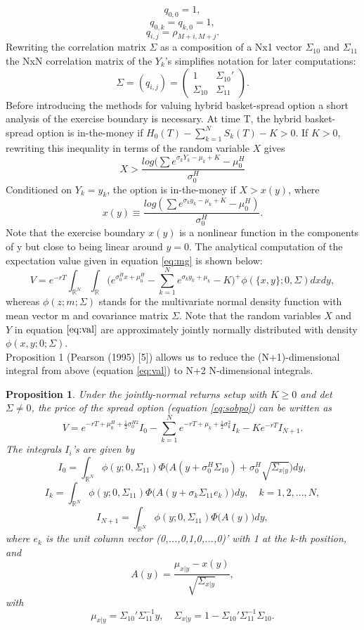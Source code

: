 \documentclass[a4paper]{article}
\newtheorem{prop}{Proposition}
\begin{document}
$$q_{0,0}=1,$$ 
$$q_{0,k}=q_{k,0}=1,$$
$$q_{i,j}=\rho_{M+i,M+j}.$$
Rewriting the correlation matrix $\Sigma$ as a composition of a Nx1 vector $\Sigma_{10}$ and $\Sigma_{11}$ the NxN correlation matrix of the $Y_k$'s simplifies notation for later computations:
$$\Sigma = (q_{i,j}) = \begin{pmatrix} 1 & \Sigma_{10}' \\ \Sigma_{10} & \Sigma_{11} \end{pmatrix}.$$ 
Before introducing the methods for valuing hybrid basket-spread option a short analysis of the exercise boundary is necessary. At time T, the hybrid basket-spread option is in-the-money 
if $H_0(T) - \sum_{k=1}^N S_k(T)-K>0$. If $K>0$, rewriting this inequality in terms of the random variable $X$ gives
$$X>\frac{log(\sum e^{\sigma_kY_k-\mu_k+K}-\mu_0^H}{\sigma_0^H}$$
Conditioned on $Y_k=y_k$, the option is in-the-money if $X>x(y)$, where
$$x(y)\equiv\frac{log(\sum e^{\sigma_ky_k-\mu_k+K}-\mu_0^H)}{\sigma_0^H}.$$
Note that the exercise boundary $x(y)$ is a nonlinear function in the components of y but close to being linear around $y=0$.
The analytical computation of the expectation value given in equation \ref{eq:mg} is shown below:
\begin{equation}
\label{eq:val}
V= e^{-rT} \int_{\mathbb{R}^N} \int_\mathbb{R} \big(e^{\sigma_0^Hx+\mu_0^H}-\sum_{k=1}^Ne^{\sigma_ky_k+\mu_k}-K\big)^+\phi(\{x,y\};0,\Sigma) dx dy,
\end{equation}
whereas $\phi(z;m;\Sigma)$ stands for the multivariate normal density function with mean vector m and covariance matrix $\Sigma$. Note that the random variables $X$ and $Y$ in equation $\ref{eq:val}$ are approximately jointly normally distributed with density $\phi({x,y};0;\Sigma)$.\\
Proposition 1 (Pearson (1995) [5]) allows us to reduce the (N+1)-dimensional integral from above (equation \ref{eq:val}) to N+2 N-dimensional integrals.

\begin{prop}
\label{prop:price}
Under the jointly-normal returns setup with $K \geq 0$ and det $\Sigma \neq 0$, the price of the spread option (equation \ref{eq:sobpo}) can be written as
$$V=e^{-rT+\mu_0^H+\frac{1}{2}\sigma_0^{H2}}I_0-\sum_{k=1}^Ne^{-rT+\mu_k+\frac{1}{2}\sigma_k^2}I_k-Ke^{-rT}I_{N+1}.$$
The integrals $I_i$'s are given by
$$I_0=\int_{\mathbb{R}^N}\phi(y;0,\Sigma_{11})\Phi\big(A(y+\sigma_0^H\Sigma_{10})+\sigma_0^H\sqrt{\Sigma_{x|y}}\big)dy,$$
$$I_k=\int_{\mathbb{R}^N}\phi(y;0,\Sigma_{11})\Phi\big(A(y+\sigma_k\Sigma_{11}e_k)\big)dy, \quad k=1,2,...,N,$$
$$I_{N+1}=\int_{\mathbb{R}^N}\phi(y;0,\Sigma_{11})\Phi\big(A(y)\big)dy,$$
where $e_k$ is the unit column vector (0,...,0,1,0,...,0)' with 1 at the k-th position, and
$$A(y)=\frac{\mu_{x|y}-x(y)}{\sqrt{\Sigma_{x|y}}},$$
with
\begin{equation}
\label{eq:inv}
\mu_{x|y}=\Sigma_{10}'\Sigma_{11}^{-1}y, \quad \Sigma_{x|y}=1-\Sigma_{10}'\Sigma_{11}^{-1}\Sigma_{10}.
\end{equation}
\end{prop}
\end{document}
